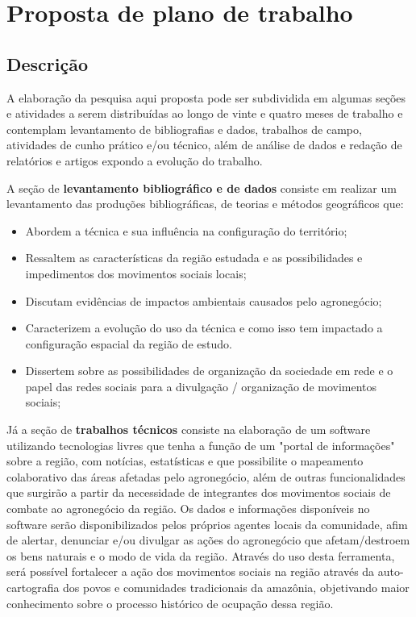 \chapter{Proposta de plano de trabalho}

\section{Descrição}

A elaboração da pesquisa aqui proposta pode ser subdividida em algumas seções e atividades a serem distribuídas ao longo de vinte e quatro meses de trabalho e contemplam levantamento de bibliografias e dados, trabalhos de campo, atividades de cunho prático e/ou técnico, além de análise de dados e redação de relatórios e artigos expondo a evolução do trabalho.

A seção de \textbf{levantamento bibliográfico e de dados} consiste em realizar um levantamento das produções bibliográficas, de teorias e métodos geográficos que:

\begin{itemize}
 \item Abordem a técnica e sua influência na configuração do território;
 \item Ressaltem as características da região estudada e as possibilidades e impedimentos dos movimentos sociais locais;
 \item Discutam evidências de impactos ambientais causados pelo agronegócio;
 \item Caracterizem a evolução do uso da técnica e como isso tem impactado a configuração espacial da região de estudo.
 \item Dissertem sobre as possibilidades de organização da sociedade em rede e o papel das redes sociais para a divulgação / organização de movimentos sociais;
\end{itemize}

Já a seção de \textbf{trabalhos técnicos} consiste na elaboração de um software utilizando tecnologias livres que tenha a função de um "portal de informações" sobre a região, com notícias, estatísticas e que possibilite o mapeamento colaborativo das áreas afetadas pelo agronegócio, além de outras funcionalidades que surgirão a partir da necessidade de integrantes dos movimentos sociais de combate ao agronegócio da região. Os dados e informações disponíveis no software serão disponibilizados pelos próprios agentes locais da comunidade, afim de alertar, denunciar e/ou divulgar as ações do agronegócio que afetam/destroem os bens naturais e o modo de vida da região. Através do uso desta ferramenta, será possível fortalecer a ação dos movimentos sociais na região através da auto-cartografia dos povos e comunidades tradicionais da amazônia, objetivando maior conhecimento sobre o processo histórico de ocupação dessa região.

